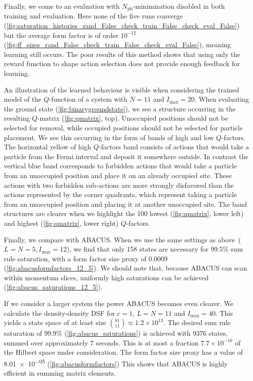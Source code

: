 \documentclass[11pt, a4paper]{report} %
\begin{document}
Finally, we come to an evaluation with \(N_{\mathrm{ph}}\)-minimization disabled in both training and evaluation.
Here none of the five runs converge (\cref{fig:saturation_histories_rand_False_check_train_False_check_eval_False}) but the average form factor is of order \(10^{-12}\) (\cref{fig:ff_sizes_rand_False_check_train_False_check_eval_False}), meaning learning still occurs.
The poor results of this method shows that using only the reward function to shape action selection does not provide enough feedback for learning.


An illustration of the learned behaviour is visible when considering the trained model of the \(Q\)-function of a system with \(N=11\) and \(I_{\max}=20\).
When evaluating the ground state (\cref{fig:binarygroundstate}), we see a structure occurring in the resulting \(Q\)-matrix (\cref{fig:qmatrix}, top).
Unoccupied positions should not be selected for removal, while occupied positions should not be selected for particle placement.
We see this occurring in the form of bands of high and low \(Q\)-factors.
The horizontal yellow of high \(Q\)-factors band consists of actions that would take a particle from the Fermi interval and deposit it somewhere outside.
In contrast the vertical blue band corresponds to forbidden actions that would take a particle from an unoccupied position and place it on an already occupied site.
These actions with two forbidden sub-actions are more strongly disfavored than the actions represented by the corner quadrants, which represent taking a particle from an unoccupied position and placing it at another unoccupied site.
The band structures are clearer when we highlight the 100 lowest (\cref{fig:qmatrix}, lower left) and highest (\cref{fig:qmatrix}, lower right) \(Q\)-factors.

\begin{sloppypar}
Finally, we compare with ABACUS.\@
When we use the same settings as above~(\(L=N=5, I_{\max}=12\)), we find that only 158 states are necessary for 99.5\% sum rule saturation, with a form factor size proxy of 0.0009 (\cref{fig:abacusformfactors_12_5}).
We should note that, because ABACUS can scan within momentum slices, uniformly high saturations can be achieved (\cref{fig:abacus_saturations_12_5}).
\end{sloppypar}

If we consider a larger system the power ABACUS becomes even clearer.
We calculate the density-density DSF for \(c=1\), \(L=N=11\) and \(I_{\max}=40\).
This yields a state space of at least size \(\binom{81}{11}\approx 1.2\times 10^{13}\).
The desired sum rule saturation of 99.9\% (\cref{fig:abacus_saturations}) is achieved with 9376 states, summed over approximately 7 seconds.
This is at most a fraction \(7.7\times 10^{-10}\) of the Hilbert space under consideration.
The form factor size proxy has a value of \num{8.01e-05} (\cref{fig:abacusformfactors})
This shows that ABACUS is highly efficient in summing matrix elements.
\end{document}
